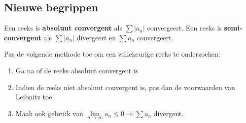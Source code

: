 \subsection{Nieuwe begrippen}
Een reeks is \textbf{absoluut convergent} als $\sum |a_n|$ convergeert. Een reeks is \textbf{semi-convergent} als $\sum |a_n|$ divergeert en $\sum a_n$ convergeert.

Pas de volgende methode toe om een willekeurige reeks te onderzoeken:
\begin{enumerate}
    \item Ga na of de reeks absoluut convergent is
    \item Indien de reeks niet absoluut convergent is, pas dan de voorwaarden van Leibnitz toe.
    \item Maak ook gebruik van $\lim\limits_{n\to\infty} a_n \leq 0 \Rightarrow \sum a_n$ divergent.
\end{enumerate}

